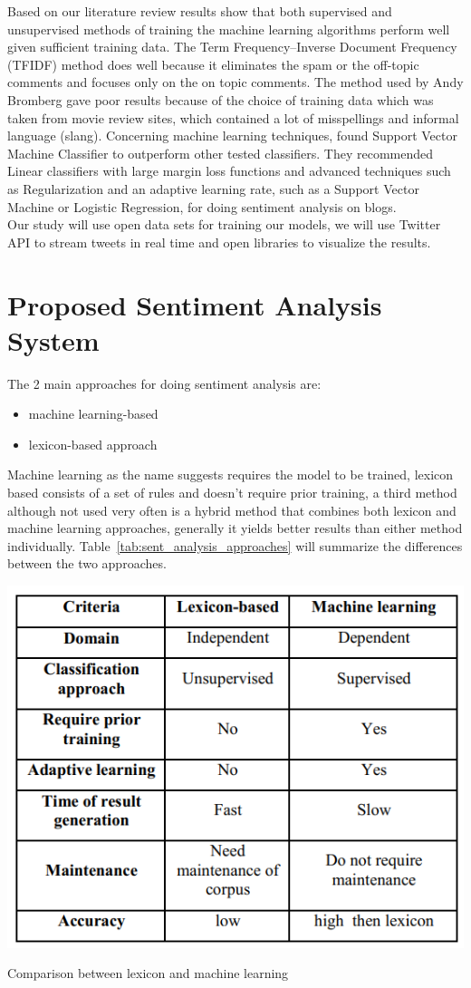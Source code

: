 Based on our literature review results show that both supervised and unsupervised methods of
training the machine learning algorithms perform well given sufficient training data. The Term Frequency–Inverse Document Frequency (TFIDF) method does well because it eliminates the
spam or the off-topic comments and focuses only on the on topic comments. The method used by
Andy Bromberg gave poor results because of the choice of training data which was taken from
movie review sites, which contained a lot of misspellings and informal language (slang).
Concerning machine learning techniques, \cite{ref41} found Support Vector
Machine Classifier to outperform other tested classifiers. They recommended Linear classifiers
with large margin loss functions and advanced techniques such as Regularization and an adaptive
learning rate, such as a Support Vector Machine or Logistic Regression, for doing sentiment
analysis on blogs.\\
Our study will use open data sets for training our models, we will use Twitter API to stream tweets in real time and open libraries to visualize the results.


\chapter{Proposed Sentiment Analysis System}

The 2  main approaches for doing sentiment analysis are: 
\begin{itemize}
\item machine learning-based
\item lexicon-based approach
\end{itemize}
%
Machine learning as the name suggests requires the model to be trained, lexicon based consists of a set of rules and doesn’t require prior training, a third method although not used very often is a hybrid method that combines both lexicon and machine learning approaches, generally it yields better results than either method individually.\cite{ref2}
%
Table~\ref{tab:sent_analysis_approaches} will summarize the differences between the two approaches.

\begin{table}[h]
  \centering
  \includegraphics[width=0.5\linewidth]{images/lex_vs_ml.png}
  \caption{Comparison between lexicon and machine learning}
  \label{tab:sent_analysis_approaches}
\end{table}

